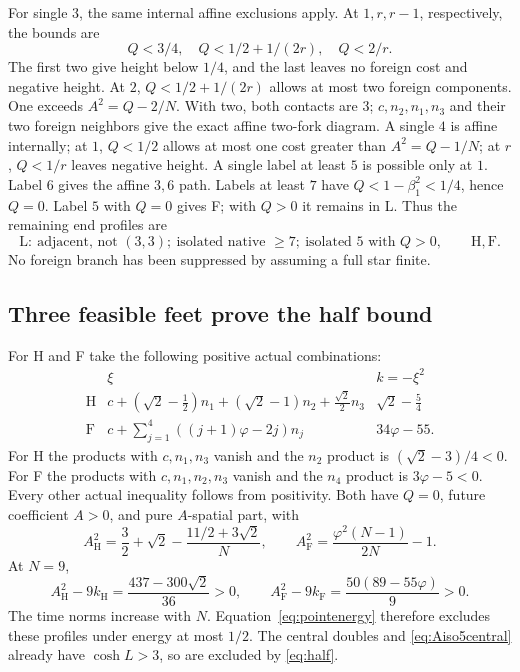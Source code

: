 \documentclass[11pt]{article}
\theoremstyle{remark}
\newcommand{\ph}{\varphi}
\begin{document}
For single \(3\), the same internal affine exclusions apply.
At \(1,r,r-1\), respectively, the bounds are
\[
 Q<3/4,\quad Q<1/2+1/(2r),\quad Q<2/r.
\]
The first two give height below \(1/4\), and the last leaves no
foreign cost and negative height. At \(2\),
\(Q<1/2+1/(2r)\) allows at most two foreign components.
One exceeds \(A^2=Q-2/N\). With two, both contacts are \(3\);
\(c,n_2,n_1,n_3\) and their two foreign neighbors give the exact
affine two-fork diagram. A single \(4\) is affine internally;
at \(1\), \(Q<1/2\) allows at most one cost greater than
\(A^2=Q-1/N\); at \(r\), \(Q<1/r\) leaves negative height.
A single label at least \(5\) is possible only at \(1\).
Label \(6\) gives the affine \(3,6\) path. Labels at least \(7\)
have \(Q<1-\beta_1^2<1/4\), hence \(Q=0\).
Label \(5\) with \(Q=0\) gives F; with \(Q>0\) it remains in L.
Thus the remaining end profiles are
\[
 \mathrm L:\ \text{adjacent, not }(3,3);
 \ \text{isolated native }\ge7;
 \ \text{isolated }5\text{ with }Q>0,
 \qquad \mathrm H,\mathrm F .
\]
No foreign branch has been suppressed by assuming a full star finite.

\subsection{Three feasible feet prove the half bound}

For H and F take the following positive actual combinations:
\[
\begin{array}{c|c|c}
 &\xi&k=-\xi^2\\ \hline
 \mathrm H&
 c+(\sqrt2-\tfrac12)n_1+(\sqrt2-1)n_2+
                         \tfrac{\sqrt2}2n_3&
 \sqrt2-\tfrac54\\
 \mathrm F&
 c+\displaystyle\sum_{j=1}^4((j+1)\ph-2j)n_j&
 34\ph-55 .
\end{array}
\]
For H the products with \(c,n_1,n_3\) vanish and the \(n_2\)
product is \((\sqrt2-3)/4<0\). For F the products with
\(c,n_1,n_2,n_3\) vanish and the \(n_4\) product is \(3\ph-5<0\).
Every other actual inequality follows from positivity. Both have
\(Q=0\), future coefficient \(A>0\), and pure \(A\)-spatial part,
with
\[
 A_{\mathrm H}^2=\frac32+\sqrt2-\frac{11/2+3\sqrt2}{N},
 \qquad
 A_{\mathrm F}^2=\frac{\ph^2(N-1)}{2N}-1.
\]
At \(N=9\),
\[
 A_{\mathrm H}^2-9k_{\mathrm H}
   =\frac{437-300\sqrt2}{36}>0,\qquad
 A_{\mathrm F}^2-9k_{\mathrm F}
   =\frac{50(89-55\ph)}9>0.
\]
The time norms increase with \(N\). Equation~\eqref{eq:pointenergy}
therefore excludes these profiles under energy at most \(1/2\).
The central doubles and \eqref{eq:Aiso5central} already have
\(\cosh L>3\), so are excluded by \eqref{eq:half}.
\end{document}
